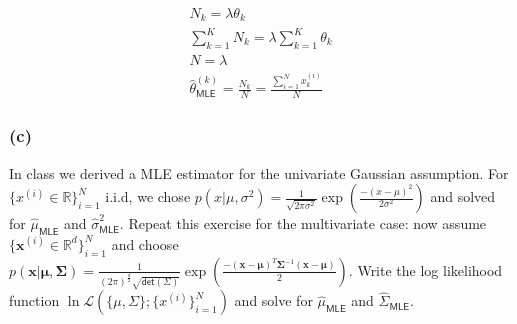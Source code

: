\documentclass[11pt]{article}
\begin{document}
{\begin{gather*}
N_k=\lambda\theta_k\\
\sum\limits_{k=1}^K N_k = \lambda\sum\limits_{k=1}^K \theta_k\\
N = \lambda\\
      \hat{\theta}^{(k)}_{\mathsf{MLE}} = \frac{N_k}{N}=\frac{\sum_{i=1}^{N} x^{(i)}_k}{N} 
\end{gather*}
	}
	
	\vfill
	
\subsubsection*{(c)}
	In class we derived a MLE estimator for the univariate Gaussian assumption. For
	 $\{x^{(i)} \in \mathbb{R} \}_{i = 1}^N$ i.i.d, we chose $p(x | \mu, \sigma^2) = \frac{1}{\sqrt{2 \pi \sigma^2}}
	 \exp \left ( \frac{- (x - \mu)^2}{2 \sigma^2} \right )$ and solved for $\hat{\mu}_{\mathsf{MLE}}$
	 and $\hat{\sigma}^2_{\mathsf{MLE}}$. Repeat this exercise for the multivariate case:
	 now assume  $\{ \mathbf{x}^{(i)} \in \mathbb{R}^d \}_{i = 1}^N$ and
	 choose $p( \mathbf{x} | \mathbf{\mu}, \mathbf{\Sigma}) =
	 \frac{1}{ (2 \pi)^{\frac{d}{2}} \sqrt{ \mathsf{det}(\Sigma) }}
	 \exp \left ( \frac{- ( \mathbf{x} - \mathbf{\mu})^T
	 	\mathbf{\Sigma}^{-1} ( \mathbf{x} - \mathbf{\mu})
	 }{2} \right )$. Write the log likelihood function 
 	$\ln \mathcal{L}( \{ \mu, \Sigma \}; \{ x^{(i)}\}_{i = 1}^N
 	)$ and solve for $\hat{\mu}_{\mathsf{MLE}}$ and $\hat{\Sigma}_{\mathsf{MLE}}$.
\end{document}
